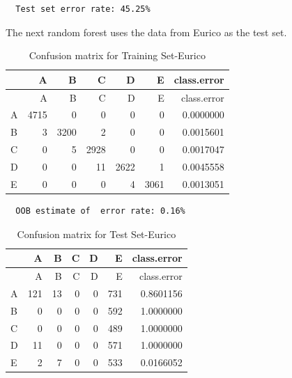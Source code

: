 \documentclass[12pt,twoside]{reedthesis}
\begin{document}
  \begin{verbatim}
  Test set error rate: 45.25%
  \end{verbatim}
  
  The next random forest uses the data from Eurico as the test set.
  
  \begin{Shaded}
  \begin{Highlighting}[]
  \NormalTok{(}\NormalTok{)}
  
  \StringTok{ }\NormalTok{wl2[wl2$user_name ==}\StringTok{ }\NormalTok{subjects[}\NormalTok{], ]}
  \StringTok{ }\NormalTok{wl2[wl2$user_name !=}\StringTok{ }\NormalTok{subjects[}\NormalTok{], ]}
  \StringTok{ }\NormalTok{(} \NormalTok{OtherSubs4[, }\NormalTok{:}\NormalTok{], } 
                                  \NormalTok{Sub4[, }\NormalTok{:}\NormalTok{], }
                                  
                                  \NormalTok{)}
  \end{Highlighting}
  \end{Shaded}
  
  \begin{longtable}[c]{@{}lrrrrrr@{}}
  \caption{Confusion matrix for Training Set-Eurico}\tabularnewline
  \toprule
  & A & B & C & D & E & class.error\tabularnewline
  \midrule
  \endfirsthead
  \toprule
  & A & B & C & D & E & class.error\tabularnewline
  \midrule
  \endhead
  A & 4715 & 0 & 0 & 0 & 0 & 0.0000000\tabularnewline
  B & 3 & 3200 & 2 & 0 & 0 & 0.0015601\tabularnewline
  C & 0 & 5 & 2928 & 0 & 0 & 0.0017047\tabularnewline
  D & 0 & 0 & 11 & 2622 & 1 & 0.0045558\tabularnewline
  E & 0 & 0 & 0 & 4 & 3061 & 0.0013051\tabularnewline
  \bottomrule
  \end{longtable}
  
  \begin{verbatim}
  OOB estimate of  error rate: 0.16%
  \end{verbatim}
  
  \begin{longtable}[c]{@{}lrrrrrr@{}}
  \caption{Confusion matrix for Test Set-Eurico}\tabularnewline
  \toprule
  & A & B & C & D & E & class.error\tabularnewline
  \midrule
  \endfirsthead
  \toprule
  & A & B & C & D & E & class.error\tabularnewline
  \midrule
  \endhead
  A & 121 & 13 & 0 & 0 & 731 & 0.8601156\tabularnewline
  B & 0 & 0 & 0 & 0 & 592 & 1.0000000\tabularnewline
  C & 0 & 0 & 0 & 0 & 489 & 1.0000000\tabularnewline
  D & 11 & 0 & 0 & 0 & 571 & 1.0000000\tabularnewline
  E & 2 & 7 & 0 & 0 & 533 & 0.0166052\tabularnewline
  \bottomrule
  \end{longtable}
  
\end{document}
